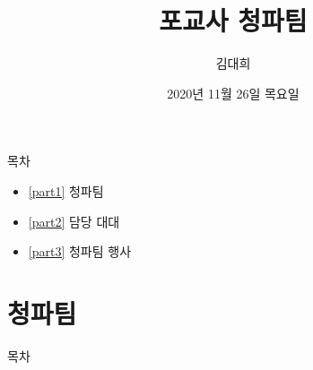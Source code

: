 \documentclass[aspectratio=1610,17pt,xcolor=pdftex,dvipsnames,table,handout]{beamer}
\begin{document}
	

			\title{ 포교사 청파팀}
			\author{ 김대희 }
			\date{ 2020년 11월 26일 목요일 }


%
%


		\begin{frame}[plain]
		\titlepage
		\end{frame}


		\begin{frame} [plain]{목차}
		\tableofcontents%


			\setlength{\leftmargini}{ 2em}			
			\begin{itemize}

				\item [part1] \ref{part1}	청파팀
				\item [part2] \ref{part2}	담당 대대
				\item [part3] \ref{part3}	청파팀 행사

			\end{itemize}



		\end{frame}



		\part{ 청파팀}
		\frame{\partpage}


		\begin{frame} [plain]{목차}
		\tableofcontents%

\label{part1} 	%

		\end{frame}
		
\end{document}
